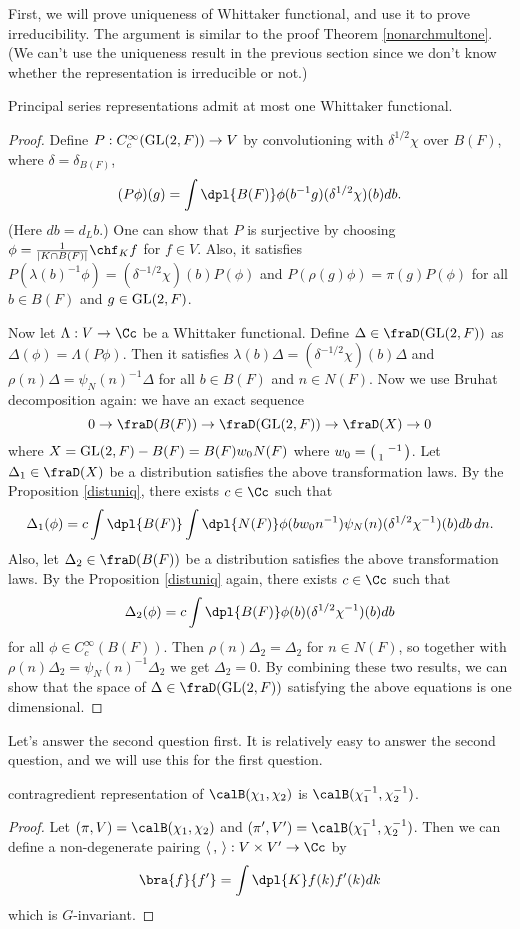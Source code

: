 First, we will prove uniqueness of Whittaker functional, and use it to prove irreducibility. The argument is similar to the proof Theorem \ref{nonarchmultone}. 
(We can't use the uniqueness result in the previous section since we don't know whether the representation is irreducible or not.) 

\begin{theorem}
\label{psrepwh}
Principal series representations admit at most one Whittaker functional. 
\end{theorem}
\begin{proof}
Define $P:C^{\infty}_{c}(\mathrm{GL}(2,F))\to V$ by convolutioning with $\delta^{1/2}\chi$ over $B(F)$, where $\delta = \delta_{B(F)}$,
$$
(P\phi)(g) = \int\dpl{B(F)} \phi(b^{-1}g) (\delta^{1/2}\chi)(b)db.
$$
(Here $db = d_{L}b$.) One can show that $P$ is surjective by choosing $\phi = \frac{1}{|K\cap B(F)|}\chf_{K}f$ for $f\in V$. 
Also, it satisfies $P(\lambda(b)^{-1}\phi) = (\delta^{-1/2}\chi)(b)P(\phi)$ and $P(\rho(g)\phi) = \pi(g)P(\phi)$ for all $b\in B(F)$ and $g\in \mathrm{GL}(2, F)$. 

Now let $\Lambda: V\to \Cc$ be a Whittaker functional. Define $\Delta\in \fraD(\GL(2, F))$ as $\Delta(\phi) = \Lambda(P\phi)$. 
Then it satisfies $\lambda(b) \Delta = (\delta^{-1/2}\chi)(b)\Delta$ and $\rho(n)\Delta = \psi_{N}(n)^{-1}\Delta$ for all $b\in B(F)$ and $n\in N(F)$. 
Now we use Bruhat decomposition again: we have an exact sequence 
$$
0\to \fraD(B(F)) \to \fraD(\GL(2, F)) \to \fraD(X) \to 0
$$
where $X = \mathrm{GL}(2, F) -  B(F) = B(F)w_{0}N(F)$ where $w_{0} = \left(\begin{smallmatrix}  & -1 \\ 1 &  \end{smallmatrix}\right)$. 
Let $\Delta_1\in \fraD(X)$ be a distribution satisfies the above transformation laws. 
By the Proposition \ref{distuniq}, there exists $c\in \Cc$ such that 
$$
\Delta_{1}(\phi) = c\int\dpl{B(F)}\int\dpl{N(F)} \phi(bw_{0}n^{-1})\psi_{N}(n)(\delta^{1/2}\chi^{-1})(b)db\,dn.
$$
Also, let $\Delta_2\in \fraD(B(F))$ be a distribution satisfies the above transformation laws. 
By the Proposition \ref{distuniq} again, there exists $c\in \Cc$ such that
$$
\Delta_2(\phi) = c\int\dpl{B(F)} \phi(b) (\delta^{1/2}\chi^{-1})(b)db
$$
for all $\phi\in C_{c}^{\infty}(B(F))$. 
Then $\rho(n)\Delta_2 = \Delta_2$ for $n\in N(F)$, so together with $\rho(n)\Delta_2 = \psi_{N}(n)^{-1}\Delta_2$ we get $\Delta_2 =0$. 
By combining these two results, we can show that the space of $\Delta\in \fraD(\GL(2, F))$ satisfying the above equations is one dimensional. 
\end{proof}


Let's answer the second question first. It is relatively easy to answer the second question, and we will use this for the first question. 
\begin{theorem}
contragredient representation of $\calB(\chi_1, \chi_2)$ is $\calB(\chi_1^{-1},\chi_2^{-1})$. \end{theorem}
\begin{proof}
Let $(\pi, V) = \calB(\chi_1, \chi_2)$ and $(\pi', V') = \calB(\chi_1^{-1}, \chi_{2}^{-1})$. 
Then we can define a non-degenerate pairing $\langle\,,\,\rangle : V\times V' \to \Cc$ by 
$$
\bra{f}{f'} = \int\dpl{K} f(k)f'(k)dk
$$
which is $G$-invariant. 
\end{proof}


